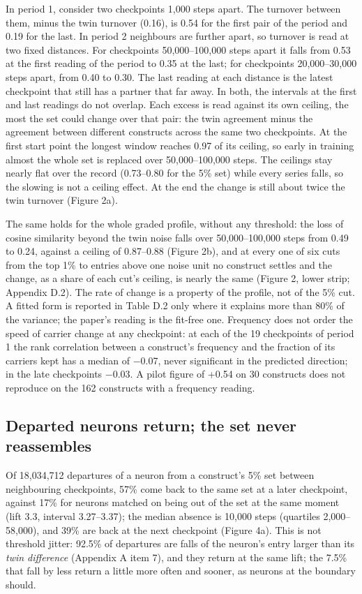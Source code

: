 \documentclass{article}
\begin{document}
In period 1, consider two checkpoints 1,000 steps apart. The turnover between them, minus the twin turnover (0.16), is 0.54 for the first pair of the period and 0.19 for the last. In period 2 neighbours are further apart, so turnover is read at two fixed distances. For checkpoints 50,000--100,000 steps apart it falls from 0.53 at the first reading of the period to 0.35 at the last; for checkpoints 20,000--30,000 steps apart, from 0.40 to 0.30. The last reading at each distance is the latest checkpoint that still has a partner that far away. In both, the intervals at the first and last readings do not overlap. Each excess is read against its own ceiling, the most the set could change over that pair: the twin agreement minus the agreement between different constructs across the same two checkpoints. At the first start point the longest window reaches 0.97 of its ceiling, so early in training almost the whole set is replaced over 50,000--100,000 steps. The ceilings stay nearly flat over the record (0.73--0.80 for the 5\% set) while every series falls, so the slowing is not a ceiling effect. At the end the change is still about twice the twin turnover (Figure 2a).

The same holds for the whole graded profile, without any threshold: the loss of cosine similarity beyond the twin noise falls over 50,000--100,000 steps from 0.49 to 0.24, against a ceiling of 0.87--0.88 (Figure 2b), and at every one of six cuts from the top 1\% to entries above one noise unit no construct settles and the change, as a share of each cut's ceiling, is nearly the same (Figure 2, lower strip; Appendix D.2). The rate of change is a property of the profile, not of the 5\% cut. A fitted form is reported in Table D.2 only where it explains more than 80\% of the variance; the paper's reading is the fit-free one. Frequency does not order the speed of carrier change at any checkpoint: at each of the 19 checkpoints of period 1 the rank correlation between a construct's frequency and the fraction of its carriers kept has a median of $-$0.07, never significant in the predicted direction; in the late checkpoints $-$0.03. A pilot figure of +0.54 on 30 constructs does not reproduce on the 162 constructs with a frequency reading.

\subsection{Departed neurons return; the set never reassembles}

Of 18,034,712 departures of a neuron from a construct's 5\% set between neighbouring checkpoints, 57\% come back to the same set at a later checkpoint, against 17\% for neurons matched on being out of the set at the same moment (lift 3.3, interval 3.27--3.37); the median absence is 10,000 steps (quartiles 2,000--58,000), and 39\% are back at the next checkpoint (Figure 4a). This is not threshold jitter: 92.5\% of departures are falls of the neuron's entry larger than its \emph{twin difference} (Appendix A item 7), and they return at the same lift; the 7.5\% that fall by less return a little more often and sooner, as neurons at the boundary should.
\end{document}
